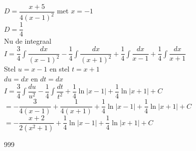 \documentclass[a4paper]{article}
\begin{document}
$D = \dfrac{x+5}{4(x-1)^2}$ met $x=-1$\\

$D = \dfrac{1}{4}$\\

Nu de integraal\\

$I = \dfrac{3}{4}\displaystyle\int\dfrac{dx}{(x-1)^2}-\dfrac{1}{4}\displaystyle\int\dfrac{dx}{(x+1)^2}+\dfrac{1}{4}\displaystyle\int\dfrac{dx}{x-1}+\dfrac{1}{4}\displaystyle\int\dfrac{dx}{x+1}$\\

Stel $u = x-1$ en stel $t = x+1$\\

$du = dx$ en $dt = dx$\\

$I = \dfrac{3}{4}\displaystyle\int\dfrac{du}{u^2}-\dfrac{1}{4}\displaystyle\int\dfrac{dt}{t^2}+\dfrac{1}{4}\ln|x-1|+\dfrac{1}{4}\ln|x+1| + C$\\

$= -\dfrac{3}{4(x-1)}+\dfrac{1}{4(x+1)}+\dfrac{1}{4}\ln|x-1|+\dfrac{1}{4}\ln|x+1| + C$\\

$= -\dfrac{x+2}{2(x^2+1)}+\dfrac{1}{4}\ln|x-1|+\dfrac{1}{4}\ln|x+1| + C$\\

\begin{thebibliography}{999}
\end{thebibliography}
\end{document}

